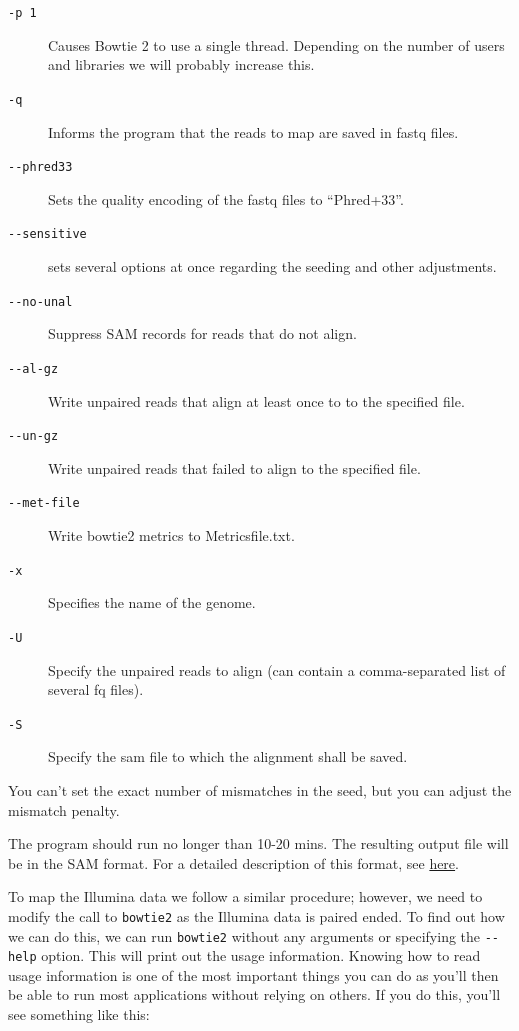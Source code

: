 \documentclass[11pt]{article}
\begin{document}
\begin{description}
\item[\texttt{-p 1}] Causes Bowtie 2 to use a single thread.
            Depending on the number of users and libraries we will  probably increase this.
\item[\texttt{-q}] Informs the program that the reads to map are saved in fastq files.
\item[\texttt{-{}-phred33}] Sets the quality encoding of the fastq files to  ``Phred+33''.
\item[\texttt{-{}-sensitive}] sets several options at once regarding the seeding and other adjustments.
\item[\texttt{-{}-no-unal}] Suppress SAM records for reads that do not align.
\item[\texttt{-{}-al-gz}] Write unpaired reads that align at least once to to the specified file.
\item[\texttt{-{}-un-gz}] Write unpaired reads that failed to align to the specified file.
\item[\texttt{-{}-met-file}] Write bowtie2 metrics to Metricsfile.txt.
\item[\texttt{-x}] Specifies the name of the genome.
\item[\texttt{-U}] Specify the unpaired reads to align (can contain a comma-separated list of several fq files).
\item[\texttt{-S}] Specify the sam file to which the alignment shall be saved.
\end{description}

You can't set the exact number of mismatches in the seed, but you can
adjust the mismatch penalty.  

The program should run no longer than 10-20 mins. The resulting output file will be
in the SAM format. For a detailed description of this format, see \href{https://samtools.github.io/hts-specs/SAMv1.pdf}{here}.

To map the Illumina data we follow a similar procedure; however, we need to
modify the call to \texttt{bowtie2} as the Illumina data is paired ended. To find
out how we can do this, we can run \texttt{bowtie2} without any arguments or
specifying the \texttt{-{}-help} option. This will
print out the usage information. Knowing how to read usage information is one
of the most important things you can do as you'll then be able to run most
applications without relying on others. If you do this, you'll see something
like this:
\end{document}
